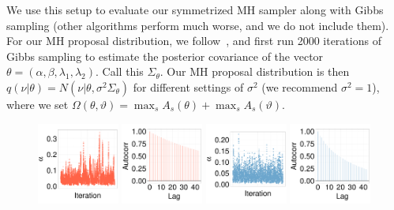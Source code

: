   We use this setup to evaluate our symmetrized MH sampler along with Gibbs sampling (other algorithms perform much worse, and we do not include them). 
  For our MH proposal distribution, we follow~\citet{gelman2013bayesian}, and first run {2000} iterations of Gibbs sampling to estimate the posterior covariance of the vector $\theta = (\alpha,\beta,\lambda_1,\lambda_2)$. Call this $\Sigma_\theta$. 
  Our MH proposal distribution is then $q(\nu|\theta) = N(\nu|\theta, \sigma^2\Sigma_\theta)$ for different settings of $\sigma^2$ (we recommend $\sigma^2 = 1$),
where we set $\Omega(\theta, \vartheta) = \max_s A_s(\theta) + \max_s A_s(\vartheta)$. 
  \begin{figure}[]
  \centering
  \begin{minipage}[!hp]{0.99\linewidth}
    \includegraphics [width=0.24\textwidth, angle=0]{figs/ecoli_ks/ecoli_alphatraceGBS_31_3_0_.pdf}
    \includegraphics [width=0.24\textwidth, angle=0]{figs/ecoli_ks/ecoli_alphagbsacf_31_3_0_.pdf}
    \includegraphics [width=0.24\textwidth, angle=0]{figs/ecoli_ks/ecoli_alphatraceMH_31_3_0_.pdf}
    \includegraphics [width=0.24\textwidth, angle=0]{figs/ecoli_ks/ecoli_alphamhacf_31_3_0_.pdf}

\end{minipage}
\end{figure}
